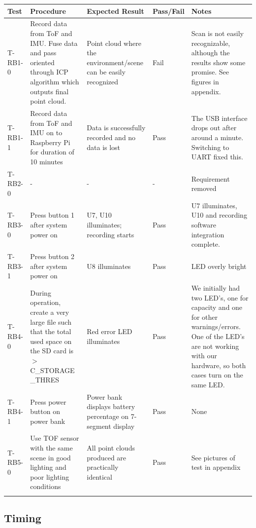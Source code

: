 \documentclass[11pt]{article}
\begin{document}
	\begin{tabularx}{\textwidth}{X p{} p{} X p{}}
		\toprule
		\textbf{Test} & \textbf{Procedure} & \textbf{Expected Result} & \textbf{Pass/Fail} & \textbf{Notes}
		\\
		\midrule
		T-RB1-0 & Record data from ToF and IMU. Fuse data and pass oriented through ICP algorithm which outputs final point cloud. & Point cloud where the environment/scene can be easily recognized & Fail & Scan is not easily recognizable, although the results show some promise. See figures in appendix.
		\\
		\midrule
		T-RB1-1 & Record data from ToF and IMU on to Raspberry Pi for duration of 10 minutes & Data is successfully recorded and no data is lost & Pass & The USB interface drops out after around a minute. Switching to UART fixed this.
		\\
		\midrule
		T-RB2-0 & - & - & - & Requirement removed 
		\\
		\midrule
		T-RB3-0 & Press button 1 after system power on & U7, U10 illuminates; recording starts & Pass & U7 illuminates, U10 and recording software integration complete.
		\\
		\midrule
		T-RB3-1 & Press button 2 after system power on & U8 illuminates & Pass & LED overly bright
		\\
		\midrule
		T-RB4-0 & During operation, create a very large file such that the total used space on the SD card is $>$C\_STORAGE
	\_THRES & Red error LED illuminates & Pass & We initially had two LED's, one for capacity and one for other warnings/errors. One of the LED's are not working with our hardware, so both cases turn on the same LED.%
		\\
		\midrule
		T-RB4-1 & Press power button on power bank & Power bank displays battery percentage on 7-segment display & Pass & None
		\\
		\midrule
		T-RB5-0 & Use TOF sensor with the same scene in good lighting and poor lighting conditions & All point clouds produced are practically identical & Pass & See pictures of test in appendix \\
		\bottomrule
		\caption{Verification Tests for Behavioural Requirements}
	\end{tabularx}
	
	
	\subsection{Timing} 
	
\end{document}
